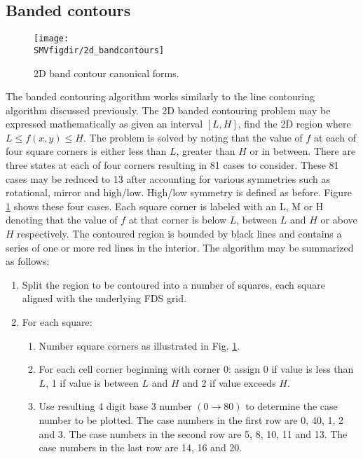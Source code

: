 \documentclass[11pt,twoside]{book}
\begin{document}
\subsection{Banded contours}
\begin{figure}[bph]
\begin{center}
\texttt{[image: \\SMVfigdir/2d\_bandcontours]}
\end{center}
\caption{2D band contour canonical forms.
  }
\label{fig2dband}%
\end{figure}
The banded contouring algorithm works similarly to the line
contouring algorithm discussed previously.  The 2D banded
contouring problem may be expressed mathematically as given an
interval $[L,H]$, find the 2D region where $L\le f(x,y)\le H$. The
problem is solved by noting that the value of $f$ at each of four
square corners is either less than $L$, greater than $H$ or in
between.  There are three states at each of four corners resulting
in 81 cases to consider.  These 81 cases may be reduced to 13
after accounting for various symmetries such as rotational, mirror
and high/low. High/low symmetry is defined as before. Figure
\ref{fig2dband} shows these four cases.  Each square corner is
labeled with an L, M or H denoting that the value of $f$ at that
corner is below $L$, between $L$  and $H$ or above $H$
respectively.  The contoured region is bounded by black lines and
contains a series of one or more red lines in the interior. The
algorithm may be summarized as follows:
\begin{enumerate}
\item Split the region to be contoured into a number of squares,
each square aligned with the underlying FDS grid.

\item For  each square:
\begin{enumerate}
\item Number square corners as illustrated in Fig.
\ref{fig2dband}.

\item For each cell corner beginning with corner 0: assign 0 if
value is less than $L$, 1 if value is between $L$ and $H$ and 2 if
value exceeds $H$.

\item Use resulting 4 digit base 3 number $(0\rightarrow 80)$ to
determine the case number to be plotted. The case numbers in the
first row are 0, 40, 1, 2 and 3.  The case numbers in the second
row are 5, 8, 10, 11 and 13.  The case numbers in the last row are
14, 16 and 20.
\end{enumerate}
\end{enumerate}
\end{document}
